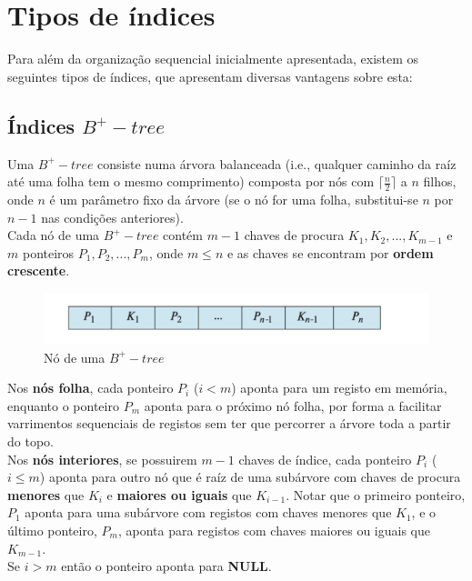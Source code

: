 \documentclass[oneside]{book}
\theoremstyle{definition}
\begin{document}
\section{Tipos de índices}

Para além da organização sequencial inicialmente apresentada, existem os seguintes tipos de índices, que apresentam diversas vantagens sobre esta:

\subsection{Índices $B^{+}-tree$}

Uma $B^{+}-tree$ consiste numa árvora balanceada (i.e., qualquer caminho da raíz até uma folha tem o mesmo comprimento) composta por nós com $\lceil\frac{n}{2}\rceil$ a $n$ filhos, onde $n$ é um parâmetro fixo da árvore (se o nó for uma folha, substitui-se $n$ por $n - 1$ nas condições anteriores). \\
Cada nó de uma $B^{+}-tree$ contém $m - 1$ chaves de procura $K_1, K_2, ..., K_{m - 1}$ e $m$ ponteiros $P_1, P_2, ..., P_{m}$, onde $m \le n$ e as chaves se encontram por \textbf{ordem crescente}.
\begin{figure}[H]
    \centering
    \includegraphics[scale = 0.50]{cap_indices/no_btree.png}
    \caption{Nó de uma $B^{+}-tree$}
\end{figure}

Nos \textbf{nós folha}, cada ponteiro $P_i$ ($i < m$) aponta para um registo em memória, enquanto o ponteiro $P_m$ aponta para o próximo nó folha, por forma a facilitar varrimentos sequenciais de registos sem ter que percorrer a árvore toda a partir do topo.\\
Nos \textbf{nós interiores}, se possuirem $m - 1$ chaves de índice, cada ponteiro $P_i$ ($i \le m$) aponta para outro nó que é raíz de uma subárvore com chaves de procura \textbf{menores} que $K_i$ e \textbf{maiores ou iguais} que $K_{i - 1}$. Notar que o primeiro ponteiro, $P_1$ aponta para uma subárvore com registos com chaves menores que $K_1$, e o último ponteiro, $P_{m}$, aponta para registos com chaves maiores ou iguais que $K_{m - 1}$.\\
Se $i > m$ então o ponteiro aponta para \textbf{NULL}.
\end{document}
